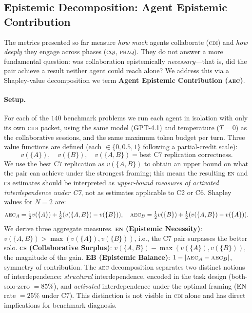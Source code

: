 \documentclass{article}
\newcommand{\CDI}{\textsc{cdi}}
\newcommand{\CQI}{\textsc{cqi}}
\newcommand{\PhAQ}{\textsc{phaq}}
\newcommand{\CIDI}{\textsc{cidi}}
\newcommand{\AEC}{\textsc{aec}}
\newcommand{\EN}{\textsc{en}}
\newcommand{\CS}{\textsc{cs}}
\begin{document}
\subsection{Epistemic Decomposition: Agent Epistemic Contribution}
\label{sec:aec}

The metrics presented so far measure \emph{how much} agents collaborate
(\CDI) and \emph{how deeply} they engage across phases (\CQI, \PhAQ).
They do not answer a more fundamental question: was collaboration
epistemically \emph{necessary}---that is, did the pair achieve a result
neither agent could reach alone? We address this via a Shapley-value
decomposition we term \textbf{Agent Epistemic Contribution (\AEC)}.

\paragraph{Setup.}
For each of the $140$ benchmark problems we run each agent in isolation
with only its own \CIDI{} packet, using the same model (GPT-4.1) and
temperature ($T = 0$) as the collaborative sessions, and the same
maximum token budget per turn. Three value functions are defined (each
$\in \{0, 0.5, 1\}$ following a partial-credit scale):
\[
  v(\{A\}),\quad v(\{B\}),\quad v(\{A,B\}) = \text{best C7 replication correctness}.
\]
We use the best C7 replication as $v(\{A,B\})$ to obtain an upper
bound on what the pair can achieve under the strongest framing; this
means the resulting \EN{} and \CS{} estimates should be interpreted
as \emph{upper-bound measures of activated interdependence under C7},
not as estimates applicable to C2 or C6. Shapley values for $N=2$ are:
\[
  \AEC_A = \tfrac{1}{2}v(\{A\}) + \tfrac{1}{2}(v(\{A,B\}) - v(\{B\})),\quad
  \AEC_B = \tfrac{1}{2}v(\{B\}) + \tfrac{1}{2}(v(\{A,B\}) - v(\{A\})).
\]
We derive three aggregate measures. \textbf{\EN{} (Epistemic
Necessity)}: $v(\{A,B\}) > \max(v(\{A\}), v(\{B\}))$, i.e., the C7
pair surpasses the better solo. \textbf{\CS{} (Collaborative Surplus)}:
$v(\{A,B\}) - \max(v(\{A\}), v(\{B\}))$, the magnitude of the gain.
\textbf{EB (Epistemic Balance)}: $1 - |\AEC_A - \AEC_B|$, symmetry of
contribution. The \AEC{} decomposition separates two distinct notions
of interdependence: \emph{structural} interdependence, encoded in the
task design (both-solo-zero $= 85\%$), and \emph{activated}
interdependence under the optimal framing (EN rate $= 25\%$ under C7).
This distinction is not visible in \CDI{} alone and has direct
implications for benchmark diagnosis.
\end{document}

